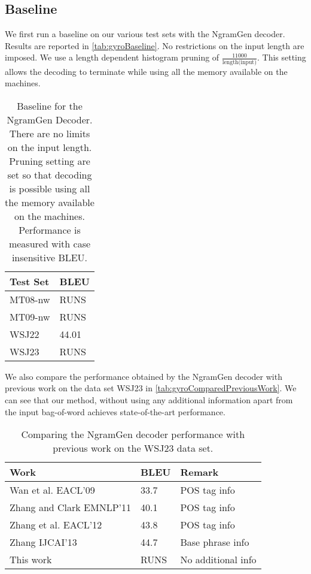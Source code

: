 \subsection{Baseline}
\label{sec:gyroBaseline}

We first run a baseline on our various test sets with the NgramGen decoder.
Results are reported in \autoref{tab:gyroBaseline}. No restrictions on the
input length are imposed. We use a length dependent histogram pruning of
$\frac{11000}{\text{length(input)}}$. This setting allows the decoding to terminate
while using all the memory available on the machines.
%
\begin{table}
  \begin{center}
  \begin{tabular}{l|l}
    Test Set & BLEU \\
    \hline
    MT08-nw & RUNS \\
    MT09-nw & RUNS \\
    WSJ22 & 44.01 \\
    WSJ23 & RUNS \\
  \end{tabular}
  \caption{Baseline for the NgramGen Decoder. There are no limits on the input length. Pruning setting are set so that decoding is possible using
  all the memory available on the machines. Performance is measured with case insensitive BLEU.}
  \label{tab:gyroBaseline}
  \end{center}
\end{table}
%
We also compare the performance obtained by the NgramGen decoder with previous
work on the data set WSJ23 in \autoref{tab:gyroComparedPreviousWork}. We can
see that our method, without using any additional information apart from the
input bag-of-word achieves state-of-the-art performance.
%
\begin{table}
\begin{center}
  \begin{tabular}{l|l|l}
    Work & BLEU & Remark \\
    \hline
    Wan et al. EACL'09 & 33.7 & POS tag info\\
    Zhang and Clark EMNLP'11 & 40.1 & POS tag info \\
    Zhang et al. EACL'12 & 43.8 & POS tag info \\
    Zhang IJCAI'13 & 44.7 & Base phrase info \\
    This work & RUNS & No additional info
  \end{tabular}
\end{center}
\caption{Comparing the NgramGen decoder performance with previous work
  on the WSJ23 data set.}
\label{tab:gyroComparedPreviousWork}
\end{table}

